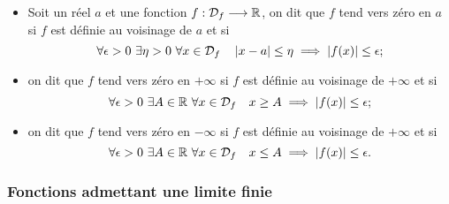 \begin{defdef}
  \begin{itemize}
  \item Soit un réel $a$ et une fonction $f:\mathcal{D}_{f} \longrightarrow \mathbb{R}$, on dit que $f$ tend vers zéro en $a$ si $f$ est définie au voisinage de $a$ et si
    \begin{equation}
      \forall \epsilon > 0 \ \exists \eta > 0 \ \forall x \in \mathcal{D}_{f} \quad \left\lvert x-a\right\rvert \leq \eta \implies \left\lvert f(x)\right\rvert \leq \epsilon ;
    \end{equation}
  \item on dit que $f$ tend vers zéro en $+\infty$ si $f$ est définie au voisinage de $+\infty$ et si
    \begin{equation}
      \forall \epsilon > 0 \ \exists A \in \mathbb{R} \ \forall x \in \mathcal{D}_{f} \quad x \geq A \implies \left\lvert f(x)\right\rvert \leq \epsilon ;
    \end{equation}
  \item on dit que $f$ tend vers zéro en $-\infty$ si $f$ est définie au voisinage de $+\infty$ et si
    \begin{equation}
      \forall \epsilon > 0 \ \exists A \in \mathbb{R} \ \forall x \in \mathcal{D}_{f} \quad x \leq A \implies \left\lvert f(x)\right\rvert \leq \epsilon.
    \end{equation}
  \end{itemize}
\end{defdef}

\subsubsection{Fonctions admettant une limite finie}

